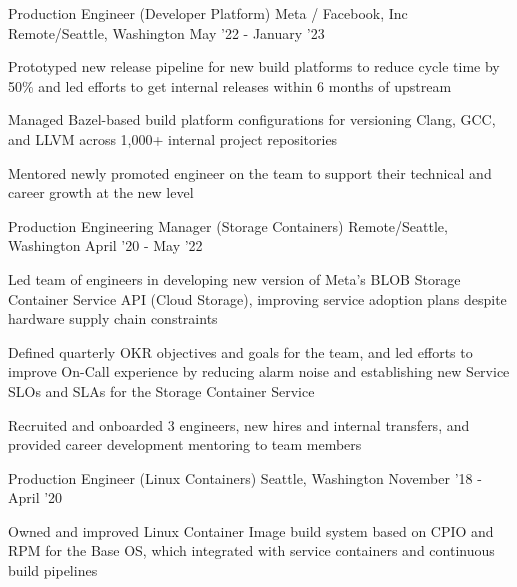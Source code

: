 \def\title{\color{solarized-cyan}Job\color{solarized-violet}(Log)}

\cvsection{\title{}{}}
\begin{cventries}
\cventry
	{Production Engineer \color{solarized-orange}(Developer Platform)} %
	{Meta / Facebook, Inc} %
    {Remote/Seattle, Washington} %
    {May '22 - January '23} %
    {
        \begin{cvitems}
		  \item Prototyped new release pipeline for new build platforms to reduce cycle time by 50\% and led efforts to get internal releases within 6 months of upstream
		  \item Managed Bazel-based build platform configurations for versioning Clang, GCC, and LLVM across 1,000+ internal project repositories
		  \item Mentored newly promoted engineer on the team to support their technical and career growth at the new level
        \end{cvitems}
    }
\vspace{0mm}
\cventry
	{Production Engineering Manager \color{solarized-orange}(Storage Containers)} %
    {} %
    {Remote/Seattle, Washington} %
    {April '20 - May '22} %
    {
        \begin{cvitems}
		  \item Led team of engineers in developing new version of Meta's BLOB Storage Container Service API (Cloud Storage), improving service adoption plans despite hardware supply chain constraints
		  \item Defined quarterly OKR objectives and goals for the team, and led efforts to improve On-Call experience by reducing alarm noise and establishing new Service SLOs and SLAs for the Storage Container Service
		  \item Recruited and onboarded 3 engineers, new hires and internal transfers, and provided career development mentoring to team members
        \end{cvitems}
    }
\vspace{0mm}
\cventry
	{Production Engineer \color{solarized-orange}(Linux Containers)} %
    {} %
    {Seattle, Washington} %
    {November '18 - April '20} %
    {
        \begin{cvitems}
		  \item Owned and improved Linux Container Image build system based on CPIO and RPM for the Base OS, which integrated with service containers and continuous build pipelines

\end{cvitems}}
\end{cventries}
